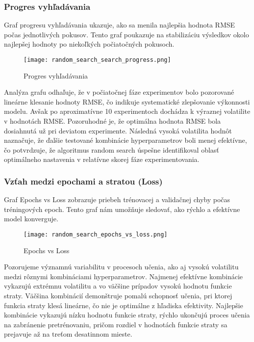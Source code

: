 \subsubsection{Progres vyhľadávania}
Graf progresu vyhľadávania ukazuje, ako sa menila najlepšia hodnota RMSE počas jednotlivých pokusov. Tento graf poukazuje na stabilizáciu výsledkov okolo najlepšej hodnoty po niekoľkých počiatočných pokusoch.

\begin{figure}[ht!]
\centering
\texttt{[image: random\_search\_search\_progress.png]}
\caption{Progres vyhľadávania}
\label{fig:random_search_search_progress}
\end{figure}
Analýza grafu odhaľuje, že v počiatočnej fáze experimentov bolo pozorované lineárne klesanie hodnoty RMSE, čo indikuje systematické zlepšovanie výkonnosti modelu. Avšak po aproximatívne 10 experimentoch dochádza k výraznej volatilite v hodnotách RMSE. Pozoruhodné je, že optimálna hodnota RMSE bola dosiahnutá už pri deviatom experimente. Následná vysoká volatilita hodnôt naznačuje, že ďalšie testované kombinácie hyperparametrov boli menej efektívne, čo potvrdzuje, že algoritmus random search úspešne identifikoval oblasť optimálneho nastavenia v relatívne skorej fáze experimentovania.

\newpage

\subsubsection{Vzťah medzi epochami a stratou (Loss)}
Graf Epochs vs Loss zobrazuje priebeh trénovacej a validačnej chyby počas tréningových epoch. Tento graf nám umožňuje sledovať, ako rýchlo a efektívne model konverguje.

\begin{figure}[ht!]
\centering
\texttt{[image: random\_search\_epochs\_vs\_loss.png]}
\caption{Epochs vs Loss}
\label{fig:random_search_epochs_vs_loss}
\end{figure}

Pozorujeme významnú variabilitu v procesoch učenia, ako aj vysokú volatilitu medzi rôznymi kombináciami hyperparametrov. Najmenej efektívne kombinácie vykazujú extrémnu volatilitu a vo väčšine prípadov vysokú hodnotu funkcie straty. Väčšina kombinácií demonštruje pomalú schopnosť učenia, pri ktorej funkcia straty klesá lineárne, čo nie je optimálne z hľadiska efektivity. Najlepšie kombinácie vykazujú nízku hodnotu funkcie straty, rýchlo ukončujú proces učenia na zabránenie pretrénovaniu, pričom rozdiel v hodnotách funkcie straty sa prejavuje až na treťom desatinnom mieste.

